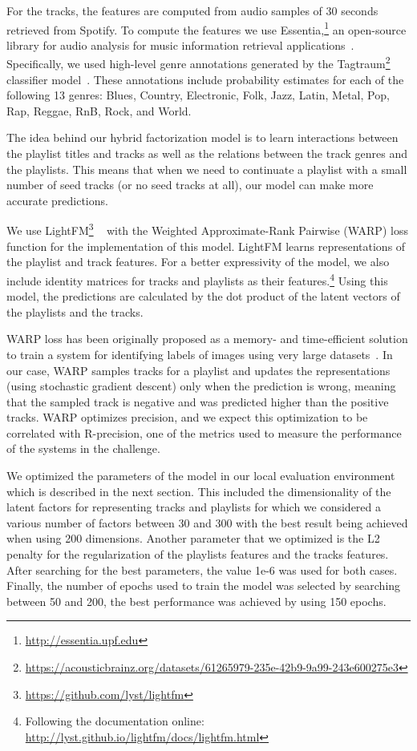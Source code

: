 For the tracks, the features are computed from audio samples of 30 seconds retrieved from Spotify. To compute the features we use Essentia,\footnote{\url{http://essentia.upf.edu}} an open-source library for audio analysis for music information retrieval applications~\cite{bogdanov2013essentia}. Specifically, we used high-level genre annotations generated by the Tagtraum\footnote{\url{https://acousticbrainz.org/datasets/61265979-235e-42b9-9a99-243e600275e3}} classifier model~\cite{bogdanov2016cross}. These annotations include probability estimates for each of the following 13 genres: Blues, Country, Electronic, Folk, Jazz, Latin, Metal, Pop, Rap, Reggae, RnB, Rock, and World. 

The idea behind our hybrid factorization model is to learn interactions between the playlist titles and tracks as well as the relations between the track genres and the playlists. This means that when we need to continuate a playlist with a small number of seed tracks (or no seed tracks at all), our model can make more accurate predictions.

We use LightFM\footnote{\url{https://github.com/lyst/lightfm}} ~\cite{kula2015metadata} with the Weighted Approximate-Rank Pairwise (WARP) loss function for the implementation of this model. LightFM learns representations of the playlist and track features. For a better expressivity of the model, we also include identity matrices for tracks and playlists as their features.\footnote{Following the documentation online: \url{http://lyst.github.io/lightfm/docs/lightfm.html}} Using this model, the predictions are calculated by the dot product of the latent vectors of the playlists and the tracks.


WARP loss has been originally proposed as a memory- and time-efficient solution to train a system for identifying labels of images using very large datasets~\cite{bonnin2015automated}.  In our case, WARP samples tracks for a playlist and updates the representations (using stochastic gradient descent) only when the prediction is wrong, meaning  that the sampled track is negative and was predicted higher than the positive tracks. WARP optimizes precision, %
and we expect this optimization to be correlated with R-precision, one of the metrics used to measure the performance of the systems in the challenge.

We optimized the parameters of the model in our local evaluation environment which is described in the next section. This included the dimensionality of the latent factors for representing tracks and playlists for which we considered a various number of factors between 30 and 300 with the best result being achieved when using 200 dimensions. Another parameter that we optimized is the L2 penalty for the regularization of the playlists features and the tracks features. After searching for the best parameters, the value 1e-6 was used for both cases. Finally, the number of epochs used to train the model was selected by searching between 50 and 200, the best performance was achieved by using 150 epochs.

